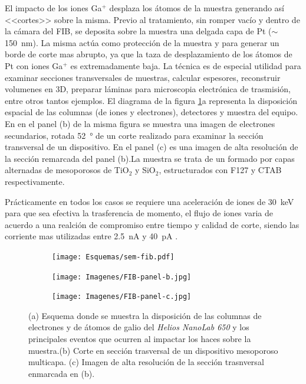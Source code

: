 		El impacto de los iones Ga${^+}$ desplaza los átomos de la muestra generando así <<cortes>> sobre la misma. Previo al tratamiento, sin romper vacío y dentro de la cámara del FIB, se deposita sobre la muestra una delgada capa de Pt ($\sim$\SI{150}{\nm}). La misma actúa como protección de la muestra y para generar un borde de corte mas abrupto, ya que la taza de desplazamiento de los átomos de Pt con iones Ga${^+}$ es extremadamente baja.\cite{Giannuzzi2005,Orloff1996} La técnica es de especial utilidad para examinar secciones transversales de muestras, calcular espesores, reconstruir volumenes en 3D, preparar láminas para microscopia electrónica de trasmisión, entre otros tantos ejemplos. El diagrama de la figura \ref{esq:sem-fib}a representa la disposición espacial de las columnas (de iones y electrones), detectores y muestra del equipo. En en el panel (b) de la misma figura se muestra una imagen de electrones secundarios, rotada \SI{52}{\degree} de un corte realizado para examinar la sección transversal de un dispositivo. En el panel (c) es una imagen de alta resolución de la sección remarcada del panel (b).La muestra se trata de un formado por capas alternadas de mesoporosos de TiO$_2$ y SiO$_2$, estructurados con F127 y CTAB respectivamente.\cite{Gimenez2017}

		Prácticamente en todos los casos se requiere una aceleración de iones de \SI{30}{\kilo\electronvolt} para que sea efectiva la trasferencia de momento, el flujo de iones varia de acuerdo a una realción de compromiso entre tiempo y calidad de corte, siendo las corriente mas utilizadas entre \SI{2.5}{\nano\ampere} y \SI{40}{\pico\ampere} \cite{Orloff2003,Reyntjens2001}.

		\begin{figure}[ht!]
			  		  \begin{subfigure}[t]{\textwidth}
			  		  \centering\texttt{[image: Esquemas/sem-fib.pdf]}
			  		  \end{subfigure}
			  		  \begin{subfigure}[t]{0.498\textwidth}
			  		  \texttt{[image: Imagenes/FIB-panel-b.jpg]}
			  		  \end{subfigure}
			  		  \begin{subfigure}[t]{0.498\textwidth}
			  		  \texttt{[image: Imagenes/FIB-panel-c.jpg]}
			  		  \end{subfigure}
			  		  \caption[Esquema de las microscopia\index{microscopía}s FIB/SEM]{(a) Esquema donde se muestra la disposición de las columnas de electrones y de átomos de galio del \textit{Helios NanoLab 650} y los principales eventos que ocurren al impactar los haces sobre la muestra.(b) Corte en sección trasversal de un dispositivo mesoporoso multicapa. (c) Imagen de alta resolución de la sección trasnversal enmarcada en (b).}
			  		  \label{esq:sem-fib}
			  		  \end{figure}
	
